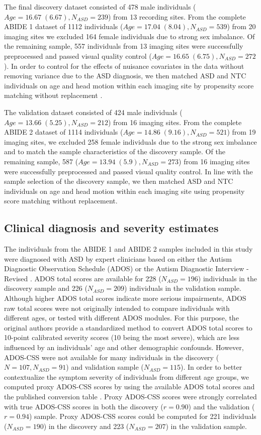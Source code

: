 \documentclass[9pt,lineno]{elife}
\begin{document}
The final discovery dataset consisted of 478 male individuals ($Age=16.67\; (6.67), N_{ASD}=239$) from 13 recording sites. From the complete ABIDE 1 dataset of 1112 individuals ($Age=17.04\; (8.04), N_{ASD}=539$) from 20 imaging sites we excluded 164 female individuals due to strong sex imbalance. Of the remaining sample, 557 individuals from 13 imaging sites were successfully preprocessed and passed visual quality control ($Age=16.65\; (6.75), N_{ASD}=272$). In order to control for the effects of nuisance covariates in the data without removing variance due to the ASD diagnosis, we then matched ASD and NTC individuals on age and head motion within each imaging site by propensity score matching without replacement \citep{Rosenbaum1985-ib}. 

The validation dataset consisted of 424 male individuals ($Age=13.66\; (5.25), N_{ASD}=212$) from 16 imaging sites. From the complete ABIDE 2 dataset of 1114 individuals ($Age=14.86\; (9.16), N_{ASD}=521$) from 19 imaging sites, we excluded 258 female individuals due to the strong sex imbalance and to match the sample characteristics of the discovery sample. Of the remaining sample, 587 ($Age=13.94\; (5.9), N_{ASD}=273$) from 16 imaging sites were successfully preprocessed and passed visual quality control. In line with the sample selection of the discovery sample, we then matched ASD and NTC individuals on age and head motion within each imaging site using propensity score matching without replacement.

\subsection{Clinical diagnosis and severity estimates}
The individuals from the ABIDE 1 and ABIDE 2 samples included in this study were diagnosed with ASD by expert clinicians based on either the Autism Diagnostic Observation Schedule (ADOS) \citep{Lord2000-vw,Gotham2007-dz,Lord2012-fi} or the Autism Diagnostic Interview - Revised \citep{Lord1994-id}. ADOS total scores are available for 228 ($N_{ASD}=196$) individuals in the discovery sample and 226 ($N_{ASD}=209$) individuals in the validation sample. Although higher ADOS total scores indicate more serious impairments, ADOS raw total scores were not originally intended to compare individuals with different ages, or tested with different ADOS modules. For this purpose, the original authors provide a standardized method \citep{Gotham2009-mi} to convert ADOS total scores to 10-point calibrated severity scores (10 being the most severe), which are less influenced by an individuals’ age and other demographic confounds. However, ADOS-CSS were not available for many individuals in the discovery ($N=107, N_{ASD}=91$) and validation sample ($N_{ASD}=115$). In order to better contextualize the symptom severity of individuals from different age groups, we computed proxy ADOS-CSS scores by using the available ADOS total scores and the published conversion table \citep{Moradi2017-cj}. Proxy ADOS-CSS scores were strongly correlated with true ADOS-CSS scores in both the discovery ($r = 0.90$) and the validation ($r = 0.94$) sample. Proxy ADOS-CSS scores could be computed for 221 individuals ($N_{ASD}=190$) in the discovery and 223 ($N_{ASD}=207$) in the validation sample.
\end{document}
